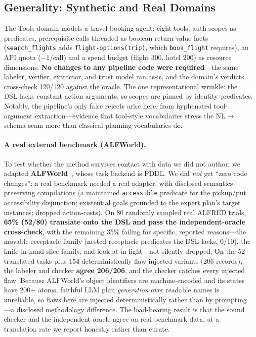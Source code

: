 \documentclass[letterpaper]{article}
\begin{document}
\subsection{Generality: Synthetic and Real Domains}
\label{sec:tools}

The Tools domain models a travel-booking agent: eight tools, auth scopes as
predicates, prerequisite calls threaded as boolean return-value facts
(\texttt{search\_flights} adds \texttt{flight-options(trip)}, which
\texttt{book\_flight} requires), an API quota ($-1$/call) and a spend
budget (flight 300, hotel 200) as resource dimensions. \textbf{No changes
to any pipeline code were required}---the same labeler, verifier,
extractor, and trust model ran as-is, and the domain's verdicts cross-check
120/120 against the oracle. The one representational wrinkle: the DSL lacks
constant action arguments, so scopes are pinned by identity predicates.
Notably, the pipeline's only false rejects arise here, from hyphenated
tool-argument extraction---evidence that tool-style vocabularies stress the
NL$\to$schema seam more than classical planning vocabularies do.

\paragraph{A real external benchmark (ALFWorld).} To test whether the method
survives contact with data we did not author, we adapted
\textbf{ALFWorld}~\citep{shridhar2021alfworld}, whose task backend is
PDDL. We did \emph{not} get ``zero code changes'': a real benchmark needed a
real adapter, with disclosed semantics-preserving compilations (a maintained
\texttt{accessible} predicate for the pickup/put accessibility disjunction;
existential goals grounded to the expert plan's target instances; dropped
action-costs). On 80 randomly sampled real ALFRED trials, \textbf{65\%
(52/80) translate onto the DSL and pass the independent-oracle cross-check},
with the remaining 35\% failing for specific, reported reasons---the
movable-receptacle family (nested-receptacle predicates the DSL lacks, 0/10),
the knife-in-hand slice family, and look-at-in-light---not silently dropped.
On the 52 translated tasks plus 154 deterministically flaw-injected variants
(206 records), the labeler and checker \textbf{agree 206/206}, and the
checker catches every injected flaw. Because ALFWorld's object identifiers
are machine-encoded and its states have 200+ atoms, faithful LLM plan
\emph{generation} over readable names is unreliable, so flaws here are
injected deterministically rather than by prompting---a disclosed
methodology difference. The load-bearing result is that the sound checker and
the independent oracle agree on real benchmark data, at a translation rate we
report honestly rather than curate.
\end{document}
